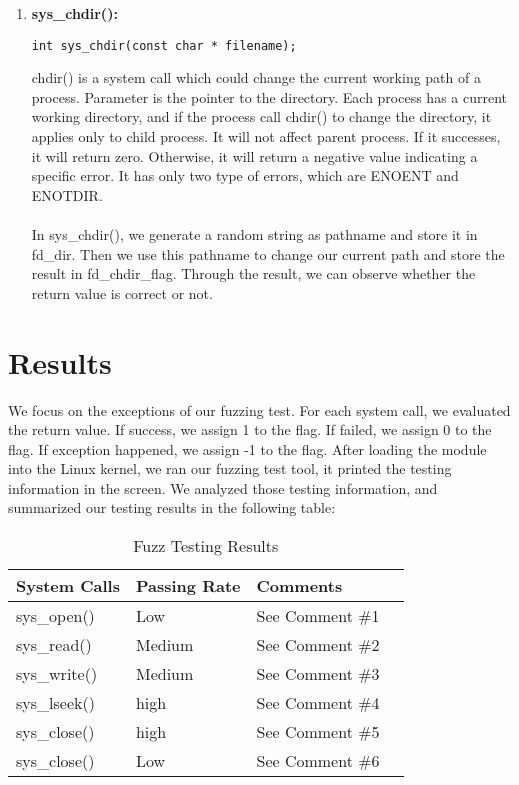 \documentclass[twoside]{article}
\begin{document}
\begin{multicols}{2}
\begin{enumerate}
\item
{\bf sys\_chdir():}
{\footnotesize
\begin{lstlisting}
int sys_chdir(const char * filename); 
\end{lstlisting}
\par}
chdir() is a system call which could change the current working path of a process. Parameter is the pointer to the directory. Each process has a current working directory, and if the process call chdir() to change the directory, it applies only to child process. It will not affect parent process. If it successes, it will return zero. Otherwise, it will return a negative value indicating a specific error. It has only two type of errors, which are ENOENT and ENOTDIR. 
\\\\
\noindent
In sys\_chdir(), we generate a random string as pathname and store it in fd\_dir. Then we use this pathname to change our current path and store the result in fd\_chdir\_flag. Through the result, we can observe whether the return value is correct or not.

\end{enumerate}


\section{Results}
We focus on the exceptions of our fuzzing test. For each system call, we evaluated the return value. If success, we assign 1 to the flag. If failed, we assign 0 to the flag. If exception happened, we assign -1 to the flag. After loading the module into the Linux kernel, we ran our fuzzing test tool, it printed the testing information in the screen. We analyzed those testing information, and summarized our testing results in the following table:

\begin{table}[H]
\caption{Fuzz Testing Results}
\centering
\begin{tabular}{lllr}
\toprule
\cmidrule(r){1-3}
System Calls & Passing Rate & Comments \\
\midrule
sys\_open() & Low & See Comment \#1 \\
sys\_read() & Medium & See Comment \#2 \\
sys\_write() & Medium & See Comment \#3 \\
sys\_lseek() & high & See Comment \#4 \\
sys\_close() & high & See Comment \#5 \\
sys\_close() & Low & See Comment \#6 \\
\bottomrule
\end{tabular}
\end{table}


\end{multicols}
\end{document}
